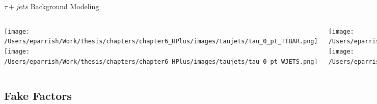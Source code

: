 \documentclass[aspectratio=169,xcolor=table]{beamer}
\begin{document}
  \begin{frame}[t]{$\tau+jets$ Background Modeling}
        \begin{columns}[t]

        \texttt{[image: /Users/eparrish/Work/thesis/chapters/chapter6\_HPlus/images/taujets/tau\_0\_pt\_TTBAR.png]}
        \texttt{[image: /Users/eparrish/Work/thesis/chapters/chapter6\_HPlus/images/taujets/tau\_0\_pt\_WJETS.png]}

        \texttt{[image: /Users/eparrish/Work/thesis/chapters/chapter6\_HPlus/images/taujets/met\_et\_TTBAR.png]}
        \texttt{[image: /Users/eparrish/Work/thesis/chapters/chapter6\_HPlus/images/taujets/met\_et\_WJETS.png]}

        \texttt{[image: /Users/eparrish/Work/thesis/chapters/chapter6\_HPlus/images/taujets/tau\_0\_pt\_BVETO.png]}
        \texttt{[image: /Users/eparrish/Work/thesis/chapters/chapter6\_HPlus/images/taujets/tau\_0\_pt\_BVETO\_MT100.png]}


        \texttt{[image: /Users/eparrish/Work/thesis/chapters/chapter6\_HPlus/images/taujets/met\_et\_BVETO.png]}
        \texttt{[image: /Users/eparrish/Work/thesis/chapters/chapter6\_HPlus/images/taujets/tau\_0\_met\_mt\_BVETO\_MT100.png]}

      \end{columns}
    \end{frame}

  \subsection{ Fake Factors }
\end{document}

